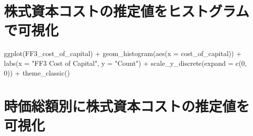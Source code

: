 \documentclass[
  letterpaper,
  DIV=11,
  numbers=noendperiod]{scrreprt}
\newenvironment{Shaded}{\begin{snugshade}}{\end{snugshade}}
\newcommand{\AttributeTok}[1]{\textcolor[rgb]{0.40,0.45,0.13}{#1}}
\newcommand{\CommentTok}[1]{\textcolor[rgb]{0.37,0.37,0.37}{#1}}
\newcommand{\DecValTok}[1]{\textcolor[rgb]{0.68,0.00,0.00}{#1}}
\newcommand{\FunctionTok}[1]{\textcolor[rgb]{0.28,0.35,0.67}{#1}}
\newcommand{\NormalTok}[1]{\textcolor[rgb]{0.00,0.23,0.31}{#1}}
\newcommand{\OtherTok}[1]{\textcolor[rgb]{0.00,0.23,0.31}{#1}}
\newcommand{\SpecialCharTok}[1]{\textcolor[rgb]{0.37,0.37,0.37}{#1}}
\newcommand{\StringTok}[1]{\textcolor[rgb]{0.13,0.47,0.30}{#1}}
\begin{document}
\begin{Shaded}
\end{Shaded}

\section{株式資本コストの推定値をヒストグラムで可視化}\label{ux682aux5f0fux8cc7ux672cux30b3ux30b9ux30c8ux306eux63a8ux5b9aux5024ux3092ux30d2ux30b9ux30c8ux30b0ux30e9ux30e0ux3067ux53efux8996ux5316}

\begin{Shaded}
\begin{Highlighting}[]
\FunctionTok{ggplot}\NormalTok{(FF3\_cost\_of\_capital) }\SpecialCharTok{+} 
  \FunctionTok{geom\_histogram}\NormalTok{(}\FunctionTok{aes}\NormalTok{(}\AttributeTok{x =}\NormalTok{ cost\_of\_capital)) }\SpecialCharTok{+} 
  \FunctionTok{labs}\NormalTok{(}\AttributeTok{x =} \StringTok{"FF3 Cost of Capital"}\NormalTok{, }\AttributeTok{y =} \StringTok{"Count"}\NormalTok{) }\SpecialCharTok{+}
  \FunctionTok{scale\_y\_discrete}\NormalTok{(}\AttributeTok{expand =} \FunctionTok{c}\NormalTok{(}\DecValTok{0}\NormalTok{, }\DecValTok{0}\NormalTok{)) }\SpecialCharTok{+} 
  \FunctionTok{theme\_classic}\NormalTok{()}
\end{Highlighting}
\end{Shaded}

\section{時価総額別に株式資本コストの推定値を可視化}\label{ux6642ux4fa1ux7dcfux984dux5225ux306bux682aux5f0fux8cc7ux672cux30b3ux30b9ux30c8ux306eux63a8ux5b9aux5024ux3092ux53efux8996ux5316}
\end{document}
